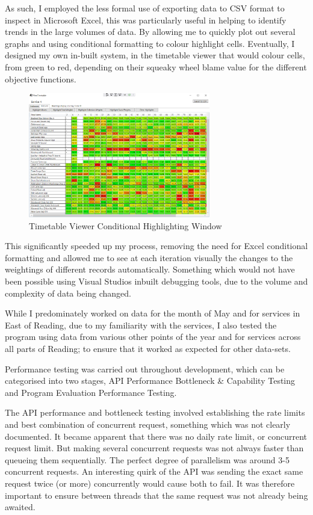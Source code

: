 \documentclass{article}
\begin{document}
\par 
As such, I employed the less formal use of exporting data to CSV format to inspect in Microsoft Excel, this was particularly useful in helping to identify trends in the large volumes of data. By allowing me to quickly plot out several graphs and using conditional formatting to colour highlight cells. Eventually, I designed my own in-built system, in the timetable viewer that would colour cells, from green to red, depending on their squeaky wheel blame value for the different objective functions. 


\begin{figure}[H]
	\centering
	\includegraphics[width=300px]{images/cellhighlights.png}
	\caption{Timetable Viewer Conditional Highlighting Window}
	\label{fig:highlighting}
\end{figure}


\par 
This significantly speeded up my process, removing the need for Excel conditional formatting and allowed me to see at each iteration visually the changes to the weightings of different records automatically. Something which would not have been possible using Visual Studios inbuilt debugging tools, due to the volume and complexity of data being changed. 

\par
While I predominately worked on data for the month of May and for services in East of Reading, due to my familiarity with the services, I also tested the program using data from various other points of the year and for services across all parts of Reading; to ensure that it worked as expected for other data-sets.


\par 
Performance testing was carried out throughout development, which can be categorised into two stages, API Performance Bottleneck \& Capability Testing and Program Evaluation Performance Testing. 

\par 
The API performance and bottleneck testing involved establishing the rate limits and best combination of concurrent request, something which was not clearly documented. It became apparent that there was no daily rate limit, or concurrent request limit. But making several concurrent requests was not always faster than queueing them sequentially. The perfect degree of parallelism was around 3-5 concurrent requests. An interesting quirk of the API was sending the exact same request twice (or more) concurrently would cause both to fail. It was therefore important to ensure between threads that the same request was not already being awaited. 
\end{document}
